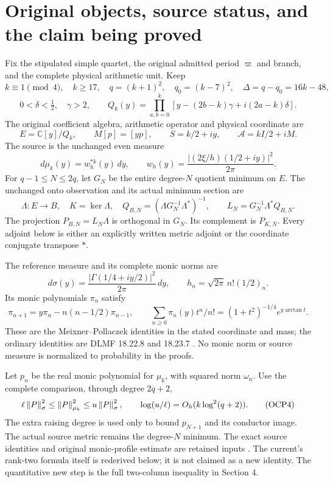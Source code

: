\documentclass[10pt]{article}
\newcommand{\C}{\mathbb C}\newcommand{\Pp}{\mathcal P}
\begin{document}
\section{Original objects, source status, and the claim being proved}
Fix the stipulated simple quartet, the original admitted period $\varpi$ and branch, and the complete physical arithmetic unit. Keep
\[
 k\equiv1\pmod4,\quad k\ge17,\quad q=(k+1)^2,\quad q_0=(k-7)^2,
 \quad\Delta=q-q_0=16k-48,
\]
\[
 0<\delta<\tfrac12,\quad\gamma>2,\qquad
 Q_k(y)=\prod_{a,b=0}^k[y-(2b-k)\gamma+i(2a-k)\delta].
\]
The original coefficient algebra, arithmetic operator and physical coordinate are
\[
 E=\C[y]/Q_k,\qquad M[p]=[yp],\qquad
 S=k/2+iy,\qquad \mathscr A=kI/2+iM.
\]
The source is the unchanged even measure
\[
 d\mu_k(y)=w_h^{*k}(y)\,dy,\qquad
 w_h(y)=\frac{|(2\xi/h)(1/2+iy)|^2}{2\pi}.
\]
For $q-1\le N\le2q$, let $G_N$ be the entire degree-$N$ quotient minimum on $E$. The unchanged onto observation and its actual minimum section are
\[
 \Lambda:E\to B,\quad K=\ker\Lambda,\quad
 Q_{B,N}=(\Lambda G_N^{-1}\Lambda^*)^{-1},\qquad
 L_N=G_N^{-1}\Lambda^*Q_{B,N}.
 \tag{OCP1}
\]
The projection $P_{B,N}=L_N\Lambda$ is orthogonal in $G_N$. Its complement is $P_{K,N}$. Every adjoint below is either an explicitly written metric adjoint or the coordinate conjugate transpose $*$.

The reference measure and its complete monic norms are
\[
 d\sigma(y)=\frac{|\Gamma(1/4+iy/2)|^2}{2\pi}\,dy,\qquad
 h_n=\sqrt{2\pi}\,n!(1/2)_n.
 \tag{OCP2}
\]
Its monic polynomials $\pi_n$ satisfy
\[
 \pi_{n+1}=y\pi_n-n(n-1/2)\pi_{n-1},\qquad
 \sum_{n\ge0}\pi_n(y)t^n/n!=(1+t^2)^{-1/4}e^{y\arctan t}.
 \tag{OCP3}
\]
These are the Meixner--Pollaczek identities in the stated coordinate and mass; the ordinary identities are DLMF 18.22.8 and 18.23.7 \cite{dlmfpoly}. No monic norm or source measure is normalized to probability in the proofs.

Let $p_n$ be the real monic polynomial for $\mu_k$, with squared norm $\omega_n$. Use the complete comparison, through degree $2q+2$,
\[
 \ell\left\lVert P\right\rVert_\sigma^2\le\left\lVert P\right\rVert_{\mu_k}^2\le u\left\lVert P\right\rVert_\sigma^2,
 \qquad \log(u/\ell)=O_h(k\log^2(q+2)).
 \tag{OCP4}
\]
The extra raising degree is used only to bound $p_{N+1}$ and its conductor image. The actual source metric remains the degree-$N$ minimum. The exact source identities and original monic-profile estimate are retained inputs \cite{heat,ivo}. The current's rank-two formula itself is rederived below; it is not claimed as a new identity. The quantitative new step is the full two-column inequality in Section 4.
\end{document}
